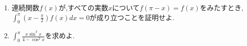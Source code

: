 \begin{problem}
  \begin{enumerate}[(1)\ ]
    \item 連続関数$f(x)$が,すべての実数$x$について$f(\pi-x)=f(x)$をみたすとき,$\int^\pi_0 \left(x-\frac{\pi}2\right) f(x)dx = 0 $が成り立つことを証明せよ.
    \item $\int^\pi_0 \frac{x \sin^3 x}{4-\cos^2 x}$を求めよ.
  \end{enumerate}
\end{problem}

